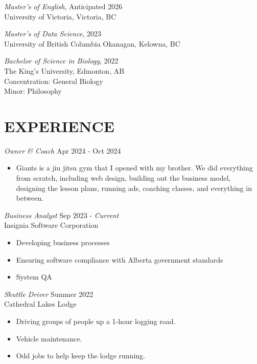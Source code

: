 \documentclass[margin, 10pt]{res} %
\begin{document}
\begin{resume}
{\sl Master's of English}, Anticipated 2026 \\
University of Victoria, Victoria, BC 

{\sl Master's of Data Science}, 2023 \\
University of British Columbia Okanagan, Kelowna, BC 

{\sl Bachelor of Science in Biology}, 2022 \\
The King's University, Edmonton, AB \\
Concentration: General Biology \\
Minor: Philosophy


\section{EXPERIENCE}

{\sl Owner \& Coach} \hfill Apr 2024 - Oct 2024 \\
\href{https://www.giantsjiujitsu.ca/}{\color{black}{Giants Jiu Jitsu}} 
\begin{itemize} \itemsep -2pt
\item Giants is a jiu jitsu gym that I opened with my brother. We did everything from scratch, including web design, building out the business model, designing the lesson plans, running ads, coaching classes, and everything in between. 
\end{itemize}


{\sl Business Analyst} \hfill Sep 2023 - \textit{Current} \\
Insignia Software Corporation
\begin{itemize} \itemsep -2pt
\item Developing business processes
\item Ensuring software compliance with Alberta government standards 
\item System QA
\end{itemize}


{\sl Shuttle Driver} \hfill Summer 2022 \\
Cathedral Lakes Lodge
\begin{itemize} \itemsep -2pt
\item Driving groups of people up a 1-hour logging road.
\item Vehicle maintenance.
\item Odd jobs to help keep the lodge running.
\end{itemize}


\end{resume}
\end{document}
